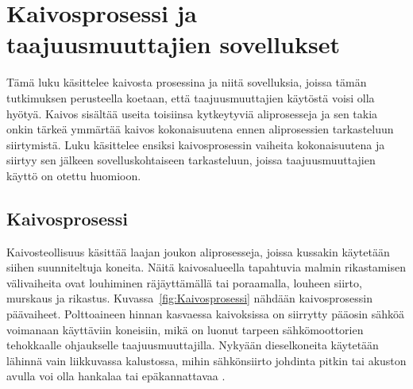 \documentclass[finnish,12pt,a4paper,pdftex,elec,utf8]{aaltothesis}
\begin{document}






\clearpage


\section{{\large Kaivosprosessi ja taajuusmuuttajien sovellukset}}
Tämä luku käsittelee kaivosta prosessina ja niitä sovelluksia, joissa tämän tutkimuksen perusteella koetaan, että taajuusmuuttajien käytöstä voisi olla hyötyä. Kaivos sisältää useita toisiinsa kytkeytyviä aliprosesseja ja sen takia onkin tärkeä ymmärtää kaivos kokonaisuutena ennen aliprosessien tarkasteluun siirtymistä. Luku käsittelee ensiksi kaivosprosessin vaiheita kokonaisuutena ja siirtyy sen jälkeen sovelluskohtaiseen tarkasteluun, joissa taajuusmuuttajien käyttö on otettu huomioon.
\subsection{Kaivosprosessi}
Kaivosteollisuus käsittää laajan joukon aliprosesseja, joissa kussakin käytetään siihen suunniteltuja koneita. Näitä kaivosalueella tapahtuvia malmin rikastamisen välivaiheita ovat louhiminen räjäyttämällä tai poraamalla, louheen siirto, murskaus ja rikastus. Kuvassa~\ref{fig:Kaivosprosessi} nähdään kaivosprosessin päävaiheet. Polttoaineen hinnan kasvaessa kaivoksissa on siirrytty pääosin sähköä voimanaan käyttäviin koneisiin, mikä on luonut tarpeen sähkömoottorien tehokkaalle ohjaukselle taajuusmuuttajilla. Nykyään dieselkoneita käytetään lähinnä vain liikkuvassa kalustossa, mihin sähkönsiirto johdinta pitkin tai akuston avulla voi olla hankalaa tai epäkannattavaa \cite{MetsoHaastattelu}.
\\\\ 
\end{document}
